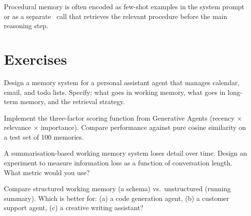 Procedural memory is often encoded as few-shot examples in the system prompt or as a separate \llm\ call that retrieves the relevant procedure before the main reasoning step.

\section{Exercises}

\begin{exercise}
	Design a memory system for a personal assistant agent that manages calendar, email, and todo lists. Specify: what goes in working memory, what goes in long-term memory, and the retrieval strategy.
\end{exercise}

\begin{exercise}
	Implement the three-factor scoring function from Generative Agents (recency $\times$ relevance $\times$ importance). Compare performance against pure cosine similarity on a test set of 100 memories.
\end{exercise}

\begin{exercise}
	A summarisation-based working memory system loses detail over time. Design an experiment to measure information loss as a function of conversation length. What metric would you use?
\end{exercise}

\begin{exercise}
	Compare structured working memory (a schema) vs.\ unstructured (running summary). Which is better for: (a) a code generation agent, (b) a customer support agent, (c) a creative writing assistant?
\end{exercise}
